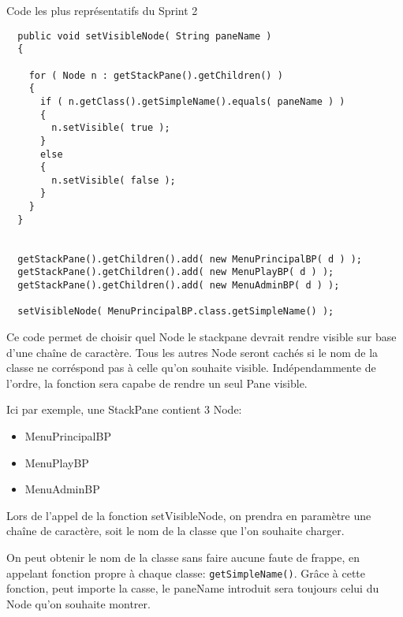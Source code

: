 Code les plus représentatifs du Sprint 2
\begin{lstlisting}
  public void setVisibleNode( String paneName )
  {

    for ( Node n : getStackPane().getChildren() )
    {
      if ( n.getClass().getSimpleName().equals( paneName ) )
      {
        n.setVisible( true );
      }
      else
      {
        n.setVisible( false );
      }
    }
  }
  

  getStackPane().getChildren().add( new MenuPrincipalBP( d ) );
  getStackPane().getChildren().add( new MenuPlayBP( d ) );
  getStackPane().getChildren().add( new MenuAdminBP( d ) );

  setVisibleNode( MenuPrincipalBP.class.getSimpleName() );
\end{lstlisting}

Ce code permet de choisir quel Node le stackpane devrait rendre visible sur base d'une chaîne de caractère.
Tous les autres Node seront cachés si le nom de la classe ne corréspond pas à celle qu'on souhaite visible.
Indépendammente de l'ordre, la fonction sera capabe de rendre un seul Pane visible.

Ici par exemple, une StackPane contient 3 Node:
\begin{itemize}
\item MenuPrincipalBP
\item MenuPlayBP
\item MenuAdminBP
\end{itemize}

Lors de l'appel de la fonction setVisibleNode, on prendra en paramètre une chaîne de caractère, soit le nom de la classe que l'on souhaite charger.

On peut obtenir le nom de la classe sans faire aucune faute de frappe, en appelant fonction propre à chaque classe: \verb|getSimpleName()|.
Grâce à cette fonction, peut importe la casse, le paneName introduit sera toujours celui du Node qu'on souhaite montrer.
